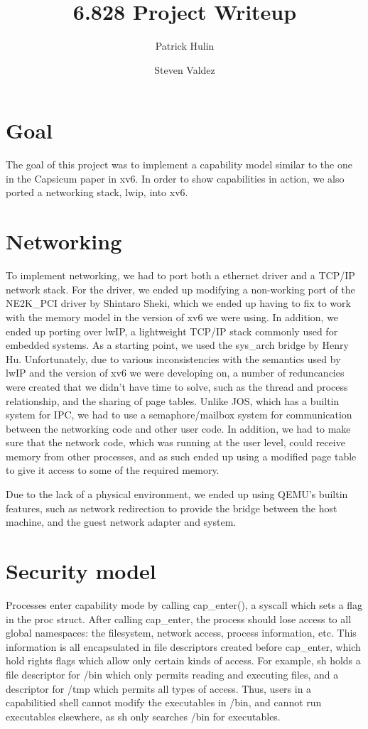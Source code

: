 \documentclass[12pt]{article}
\title{6.828 Project Writeup}
\author{Patrick Hulin \and Steven Valdez}
\begin{document}
\maketitle

\section{Goal}
The goal of this project was to implement a capability model similar to the one in the Capsicum paper in xv6. In order to show capabilities in action, we also ported a networking stack, lwip, into xv6.

\section{Networking}
To implement networking, we had to port both a ethernet driver and a TCP/IP network stack. For the driver, we ended up modifying a non-working port of the NE2K\_PCI driver by Shintaro Sheki, which we ended up having to fix to work with the memory model in the version of xv6 we were using. In addition, we ended up porting over lwIP, a lightweight TCP/IP stack commonly used for embedded systems. As a starting point, we used the sys\_arch bridge by Henry Hu. Unfortunately, due to various inconsistencies with the semantics used by lwIP and the version of xv6 we were developing on, a number of reduncancies were created that we didn't have time to solve, such as the thread and process relationship, and the sharing of page tables. Unlike JOS, which has a builtin system for IPC, we had to use a semaphore/mailbox system for communication between the networking code and other user code. In addition, we had to make sure that the network code, which was running at the user level, could receive memory from other processes, and as such ended up using a modified page table to give it access to some of the required memory.

Due to the lack of a physical environment, we ended up using QEMU's builtin features, such as network redirection to provide the bridge between the host machine, and the guest network adapter and system. 

\section{Security model}
Processes enter capability mode by calling cap\_enter(), a syscall which sets a flag in the proc struct. After calling cap\_enter, the process should lose access to all global namespaces: the filesystem, network access, process information, etc. This information is all encapsulated in file descriptors created before cap\_enter, which hold rights flags which allow only certain kinds of access. For example, sh holds a file descriptor for /bin which only permits reading and executing files, and a descriptor for /tmp which permits all types of access. Thus, users in a capabilitied shell cannot modify the executables in /bin, and cannot run executables elsewhere, as sh only searches /bin for executables.
\end{document}
